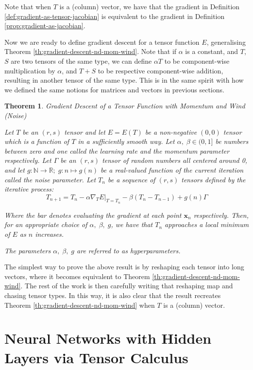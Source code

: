 \documentclass[a4paper]{article}
\theoremstyle{plain} %
\newtheorem{theorem}{Theorem}[section]
\theoremstyle{definition} %
\numberwithin{equation}{subsection}
\newcommand{\R}{\mathbb{R}}
\newcommand{\N}{\mathbb{N}}
\newcommand{\vx}{{\textbf{x}}}
\begin{document}
Note that when $T$ is a (column) vector, we have that the gradient in Definition \ref{def:gradient-as-tensor-jacobian} is equivalent to 
the gradient in Definition \ref{prop:gradient-as-jacobian}.

Now we are ready to define gradient descent for a tensor function $E$, generalising Theorem \ref{th:gradient-descent-nd-mom-wind}. 
Note that if $\alpha$ is a constant, and $T$, $S$ are two tensors of the same type, we can define $\alpha T$ to be component-wise multiplication 
by $\alpha$, and $T + S$ to be respective component-wise addition, resulting in another tensor of the same type. This is in the same spirit with how 
we defined the same notions for matrices and vectors in previous sections.

\begin{theorem}
  Gradient Descent of a Tensor Function with Momentum and Wind (Noise)
  
  Let $T$ be an $(r,s)$ tensor and let $E = E(T)$ be a non-negative $(0,0)$ tensor which is a function of $T$ in a sufficiently smooth way.
  Let $\alpha, \; \beta \in (0,1]$ be numbers between zero and one called the learning rate and the momentum parameter respectively. 
  Let $\Gamma$ be an $(r,s)$ tensor of random numbers all centered around 0, and let 
  $g: \N \rightarrow \R; \; g: n \mapsto g(n)$ be a real-valued function of 
  the current iteration called the noise parameter.
  Let $T_n$ be a sequence of $(r,s)$ tensors defined by the iterative process:
  \[ T_{n+1} = T_n - \alpha \nabla_T E \big|_{T = T_n} - \beta (T_{n} - T_{n-1}) + g(n)\Gamma \]

  Where the bar denotes evaluating the gradient at each point $\vx_n$ respectively. Then, for an appropriate choice of $\alpha, \; \beta, \; g$,
  we have that $T_n$ approaches a local minimum of $E$ as $n$ increases.

  The parameters $\alpha, \; \beta, \; g$ are referred to as hyperparameters.
\end{theorem}

The simplest way to prove the above result is by reshaping each tensor into long vectors, where it becomes equivalent to Theorem \ref{th:gradient-descent-nd-mom-wind}. 
The rest of the work is then carefully writing that reshaping map and chasing tensor types. 
In this way, it is also clear that the result recreates Theorem \ref{th:gradient-descent-nd-mom-wind} when $T$ is a (column) vector.
\newpage
\section{Neural Networks with Hidden Layers via Tensor Calculus}
\end{document}
